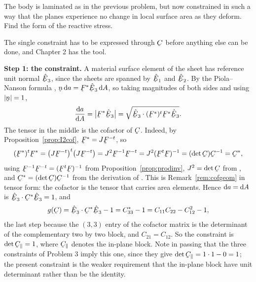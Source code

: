\begin{problem}
The body is laminated as in the previous problem, but now constrained in
such a way that the planes experience no change in local surface area as
they deform. Find the form of the reactive stress.
\end{problem}

\begin{solution}
The single constraint has to be expressed through $\bC$ before anything
else can be done, and Chapter 2 has the tool.

\textbf{Step 1: the constraint.} A material surface element of the sheet
has reference unit normal $\hbE_{3}$, since the sheets are spanned by
$\hbE_{1}$ and $\hbE_{2}$. By the Piola--Nanson formula ,
$\bn\,\dl a=\bF^{*}\hbE_{3}\,\dl A$, so taking magnitudes of both sides
and using $|\bn|=1$,
\[
   \frac{\dl a}{\dl A}=\big|\bF^{*}\hbE_{3}\big|
   =\sqrt{\ip{\hbE_{3}}{(\bF^{*})^{t}\bF^{*}\hbE_{3}}} .
\]
The tensor in the middle is the cofactor of $\bC$. Indeed, by
Proposition~\ref{prop:I2cof}, $\bF^{*}=J\bF^{-t}$, so
\[
   (\bF^{*})^{t}\bF^{*}=\big(J\bF^{-t}\big)^{t}\big(J\bF^{-t}\big)
   =J^{2}\bF^{-1}\bF^{-t}=J^{2}(\bF^{t}\bF)^{-1}
   =(\det\bC)\bC^{-1}=\bC^{*},
\]
using $\bF^{-1}\bF^{-t}=(\bF^{t}\bF)^{-1}$ from
Proposition~\ref{prop:prodinv}, $J^{2}=\det\bC$ from , and
$\bC^{*}=(\det\bC)\bC^{-1}$ from the derivation of . This is
Remark~\ref{rem:cofgeom} in tensor form: the cofactor is the tensor that
carries area elements. Hence $\mathrm{d} a=\mathrm{d} A$ is $\ip{\hbE_{3}}{\bC^{*}
\hbE_{3}}=1$, and
\[
   g(\bC)=\ip{\hbE_{3}}{\bC^{*}\hbE_{3}}-1=C^{*}_{33}-1
   =C_{11}C_{22}-C_{12}^{2}-1 ,
\]
the last step because the $(3,3)$ entry of the cofactor matrix is the
determinant of the complementary two by two block, and $C_{21}=C_{12}$.
So the constraint is $\det\bC_{\parallel}=1$, where $\bC_{\parallel}$
denotes the in-plane block. Note in passing that the three constraints of
Problem 3 imply this one, since they give $\det\bC_{\parallel}
=1\cdot1-0=1$; the present constraint is the weaker requirement that the
in-plane block have unit determinant rather than be the identity.


\end{solution}

